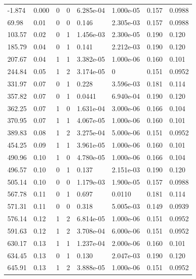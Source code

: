 \documentclass[preview]{standalone}
\begin{document}
{{\begin{tabular}{L{1.2cm}C{1.2cm} C{0.3cm}C{0.5cm} C{1.4cm}C{1.4cm} C{1.4cm}C{1.4cm}}
  -1.874  &  0.000  & 0     &  0 &  6.285e-04  & 1.000e-05  & 0.157 &  0.0988   \\ 
  69.98  &  0.01  & 0     &  0 &  0.146  & 2.305e-03  & 0.157 &  0.0988   \\ 
  103.57  &  0.02  & 0     &  1 &  1.456e-03  & 2.300e-05  & 0.190 &  0.120   \\ 
  185.79  &  0.04  & 0     &  1 &  0.141  & 2.212e-03  & 0.190 &  0.120   \\ 
  207.67  &  0.04  & 1     &  1 &  3.382e-05  & 1.000e-06  & 0.160 &  0.101   \\ 
  244.84  &  0.05  & 1     &  2 &  3.174e-05  & 0  & 0.151 &  0.0952   \\ 
  331.97  &  0.07  & 0     &  1 &  0.228  & 3.596e-03  & 0.181 &  0.114   \\ 
  357.82  &  0.07  & 0     &  1 &  0.0441  & 6.940e-04  & 0.190 &  0.120   \\ 
  362.25  &  0.07  & 1     &  0 &  1.631e-04  & 3.000e-06  & 0.166 &  0.104   \\ 
  370.95  &  0.07  & 1     &  1 &  4.067e-05  & 1.000e-06  & 0.160 &  0.101   \\ 
  389.83  &  0.08  & 1     &  2 &  3.275e-04  & 5.000e-06  & 0.151 &  0.0952   \\ 
  454.25  &  0.09  & 1     &  1 &  3.961e-05  & 1.000e-06  & 0.160 &  0.101   \\ 
  490.96  &  0.10  & 1     &  0 &  4.780e-05  & 1.000e-06  & 0.166 &  0.104   \\ 
  496.57  &  0.10  & 0     &  1 &  0.137  & 2.151e-03  & 0.190 &  0.120   \\ 
  505.14  &  0.10  & 0     &  0 &  1.179e-03  & 1.900e-05  & 0.157 &  0.0988   \\ 
  567.78  &  0.11  & 0     &  1 &  0.697  & 0.0110  & 0.181 &  0.114   \\ 
  571.31  &  0.11  & 0     &  0 &  0.318  & 5.005e-03  & 0.149 &  0.0939   \\ 
  576.14  &  0.12  & 1     &  2 &  6.814e-05  & 1.000e-06  & 0.151 &  0.0952   \\ 
  591.63  &  0.12  & 1     &  2 &  3.708e-04  & 6.000e-06  & 0.151 &  0.0952   \\ 
  630.17  &  0.13  & 1     &  1 &  1.237e-04  & 2.000e-06  & 0.160 &  0.101   \\ 
  634.45  &  0.13  & 0     &  1 &  0.130  & 2.047e-03  & 0.190 &  0.120   \\ 
  645.91  &  0.13  & 1     &  2 &  3.888e-05  & 1.000e-06  & 0.151 &  0.0952   \\ 

\end{tabular}}}
\end{document}
